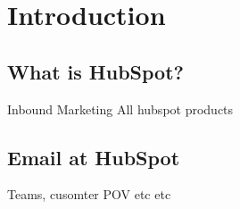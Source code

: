 \chapter{Introduction}

\section{What is HubSpot?}
Inbound Marketing
All hubspot products

\section{Email at HubSpot}
Teams, cusomter POV etc etc